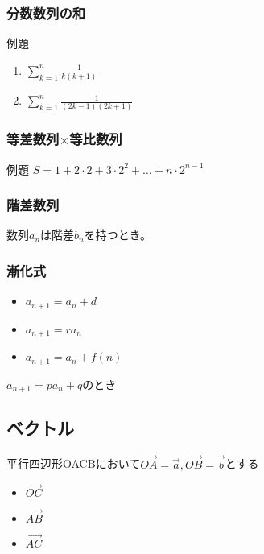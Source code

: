 \documentclass[10pt,dvipdfmx]{jsarticle}
\begin{document}
\subsubsection*{分数数列の和}
\begin{itembox}[l]{例題}
  \begin{Large}
    \begin{enumerate}
      \item $\sum_{k=1}^{n}\frac{1}{k(k+1)}$
      \item $\sum_{k=1}^{n}\frac{1}{(2k-1)(2k+1)}$
    \end{enumerate}
  \end{Large}
\end{itembox}

\subsubsection*{等差数列$\times$等比数列}
\begin{itembox}[l]{例題}
  $S=1+2\cdot2+3\cdot2^2+\dots+n\cdot2^{n-1}$
  \vspace{15mm}
\end{itembox}

\subsubsection*{階差数列}
数列$a_n$は階差$b_n$を持つとき。
\vspace{8mm}

\subsubsection*{漸化式}
\begin{multicols}{3}
  \begin{large}
    \begin{itemize}
      \item $a_{n+1}=a_n+d$
      \item $a_{n+1}=ra_n$
      \item $a_{n+1}=a_n+f(n)$
    \end{itemize}
  \end{large}
\end{multicols}
\vspace{8mm}
$a_{n+1}=pa_n+q$のとき




\newpage
\subsection*{ベクトル}
平行四辺形OACBにおいて$\vec{OA}=\vec{a}, \vec{OB}=\vec{b}$とする
\begin{multicols}{3}
  \begin{itemize}
    \item $\vec{OC}$
    \item $\vec{AB}$
    \item $\vec{AC}$
  \end{itemize}
\end{multicols}
\end{document}
